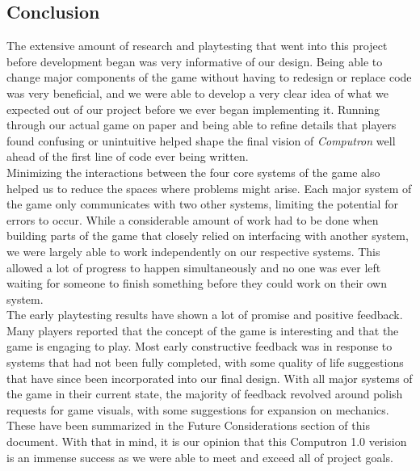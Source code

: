 \subsection{Conclusion}
The extensive amount of research and playtesting that went into this project before development began was very informative of our design. Being able to change major components of the game without having to redesign or replace code was very beneficial, and we were able to develop a very clear idea of what we expected out of our project before we ever began implementing it. Running through our actual game on paper and being able to refine details that players found confusing or unintuitive helped shape the final vision of \textit{Computron} well ahead of the first line of code ever being written.\\

Minimizing the interactions between the four core systems of the game also helped us to reduce the spaces where problems might arise. Each major system of the game only communicates with two other systems, limiting the potential for errors to occur. While a considerable amount of work had to be done when building parts of the game that closely relied on interfacing with another system, we were largely able to work independently on our respective systems. This allowed a lot of progress to happen simultaneously and no one was ever left waiting for someone to finish something before they could work on their own system.\\

The early playtesting results have shown a lot of promise and positive feedback. Many players reported that the concept of the game is interesting and that the game is engaging to play. Most early constructive feedback was in response to systems that had not been fully completed, with some quality of life suggestions that have since been incorporated into our final design. With all major systems of the game in their current state, the majority of feedback revolved around polish requests for game visuals, with some suggestions for expansion on mechanics. These have been summarized in the Future Considerations section of this document. With that in mind, it is our opinion that this Computron 1.0 verision is an immense success as we were able to meet and exceed all of project goals.\\

